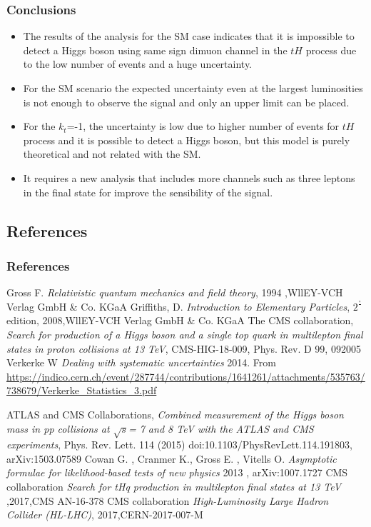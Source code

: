 \documentclass[11pt]{beamer}
\begin{document}
\begin{frame}
\frametitle{Conclusions}
\begin{itemize}
\item The results of the analysis for the SM case indicates that it is impossible to detect a Higgs boson using same sign dimuon channel in the $tH$ process due to the low number of events and a huge uncertainty.
\item For the SM scenario the expected uncertainty even at the largest luminosities is not enough to observe the signal and only an upper limit can be placed.
\item For the $k_t$=-1, the uncertainty is low due to higher number of events for $tH$ process and it is possible to detect a Higgs boson, but this model is purely theoretical and not related with the SM.
\item It requires a new analysis that includes more channels such as three leptons in the final state for improve the sensibility of the signal.
\end{itemize}
\end{frame}


	\begin{thebibliography}{99}
		
	\begin{frame}
	\small
	\section{References}
	\frametitle{References}
	
	Gross F. \textit{Relativistic quantum mechanics and field theory}, 1994 ,WllEY-VCH Verlag GmbH \& Co. KGaA
	 Griffiths, D. \textit{Introduction to Elementary Particles}, $2^\frac{\circ}{}$ edition, 2008,WllEY-VCH Verlag GmbH \& Co. KGaA
		The CMS collaboration, \textit{Search for production of a Higgs boson and a single top
	quark in multilepton final states in proton collisions at 13 TeV}, CMS-HIG-18-009, Phys. Rev. D 99, 092005
	Verkerke W \textit{Dealing with systematic uncertainties} 2014. From
\url{https://indico.cern.ch/event/287744/contributions/1641261/attachments/535763/738679/Verkerke_Statistics_3.pdf}
\end{frame}

\begin{frame}
\small
{} ATLAS and CMS
Collaborations, \textit{Combined measurement of the Higgs boson mass in
	pp collisions at $\sqrt{s}$= 7 and 8 TeV with the ATLAS and CMS experiments}, Phys. Rev. Lett.
114 (2015) doi:10.1103/PhysRevLett.114.191803, arXiv:1503.07589
 Cowan G. , Cranmer K., Gross E. , Vitells O.\textit{ Asymptotic formulae for
	likelihood-based tests of new physics} 2013 , arXiv:1007.1727
CMS collaboration \textit{Search for tHq production in multilepton final states at 13 TeV} ,2017,CMS AN-16-378
CMS collaboration \textit{High-Luminosity Large Hadron Collider (HL-LHC)}, 2017,CERN-2017-007-M


\end{frame}
\end{thebibliography}
\end{document}
